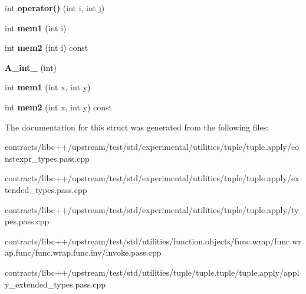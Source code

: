 \begin{DoxyCompactItemize}
int {\bfseries operator()} (int i, int j)
\item 
\mbox{\label{struct_a__int__2_a6b47ab0ee30e4217c09b77e0f1c326f7}} 
int {\bfseries mem1} (int i)
\item 
\mbox{\label{struct_a__int__2_a414416c4ec4759d640643e953aba01a0}} 
int {\bfseries mem2} (int i) const
\item 
\mbox{\label{struct_a__int__2_af2e15812666505544a018c7088ceaa73}} 
{\bfseries A\+\_\+int\+\_} (int)
\item 
\mbox{\label{struct_a__int__2_af074c8f7392398ef8b86bc8bc4af4d92}} 
int {\bfseries mem1} (int x, int y)
\item 
\mbox{\label{struct_a__int__2_ae2054ff53afdf458b8530e1b34828337}} 
int {\bfseries mem2} (int x, int y) const
\end{DoxyCompactItemize}


The documentation for this struct was generated from the following files\+:\begin{DoxyCompactItemize}
\item 
contracts/libc++/upstream/test/std/experimental/utilities/tuple/tuple.\+apply/constexpr\+\_\+types.\+pass.\+cpp\item 
contracts/libc++/upstream/test/std/experimental/utilities/tuple/tuple.\+apply/extended\+\_\+types.\+pass.\+cpp\item 
contracts/libc++/upstream/test/std/experimental/utilities/tuple/tuple.\+apply/types.\+pass.\+cpp\item 
contracts/libc++/upstream/test/std/utilities/function.\+objects/func.\+wrap/func.\+wrap.\+func/func.\+wrap.\+func.\+inv/invoke.\+pass.\+cpp\item 
contracts/libc++/upstream/test/std/utilities/tuple/tuple.\+tuple/tuple.\+apply/apply\+\_\+extended\+\_\+types.\+pass.\+cpp\end{DoxyCompactItemize}
